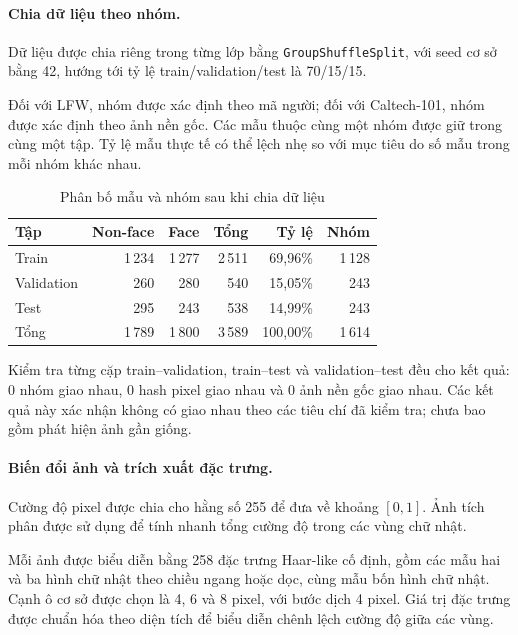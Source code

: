 \documentclass[12pt,a4paper,oneside]{report}
\begin{document}
\paragraph{Chia dữ liệu theo nhóm.}

Dữ liệu được chia riêng trong từng lớp bằng
\texttt{GroupShuffleSplit}, với seed cơ sở bằng 42,
hướng tới tỷ lệ train/validation/test là 70/15/15.

Đối với LFW, nhóm được xác định theo mã người;
đối với Caltech-101, nhóm được xác định theo ảnh nền gốc.
Các mẫu thuộc cùng một nhóm được giữ trong cùng một tập.
Tỷ lệ mẫu thực tế có thể lệch nhẹ so với mục tiêu
do số mẫu trong mỗi nhóm khác nhau.

\begin{table}[H]
    \centering
    \caption{Phân bố mẫu và nhóm sau khi chia dữ liệu}
    \label{tab:chia_tap_mohinh}
    \small
    \begin{tabularx}{\textwidth}{
        >{\raggedright\arraybackslash}X r r r r r}
        \toprule
        \textbf{Tập}
        & \textbf{Non-face}
        & \textbf{Face}
        & \textbf{Tổng}
        & \textbf{Tỷ lệ}
        & \textbf{Nhóm} \\
        \midrule
        Train
        & 1\,234 & 1\,277 & 2\,511 & 69,96\% & 1\,128 \\
        Validation
        & 260 & 280 & 540 & 15,05\% & 243 \\
        Test
        & 295 & 243 & 538 & 14,99\% & 243 \\
        \midrule
        Tổng
        & 1\,789 & 1\,800 & 3\,589 & 100,00\% & 1\,614 \\
        \bottomrule
    \end{tabularx}
\end{table}

Kiểm tra từng cặp train--validation, train--test
và validation--test đều cho kết quả:
0 nhóm giao nhau, 0 hash pixel giao nhau
và 0 ảnh nền gốc giao nhau.
Các kết quả này xác nhận không có giao nhau
theo các tiêu chí đã kiểm tra;
chưa bao gồm phát hiện ảnh gần giống.

\paragraph{Biến đổi ảnh và trích xuất đặc trưng.}

Cường độ pixel được chia cho hằng số 255
để đưa về khoảng $[0,1]$.
Ảnh tích phân được sử dụng để tính nhanh
tổng cường độ trong các vùng chữ nhật.

Mỗi ảnh được biểu diễn bằng 258 đặc trưng Haar-like
cố định, gồm các mẫu hai và ba hình chữ nhật
theo chiều ngang hoặc dọc, cùng mẫu bốn hình chữ nhật.
Cạnh ô cơ sở được chọn là 4, 6 và 8 pixel,
với bước dịch 4 pixel.
Giá trị đặc trưng được chuẩn hóa theo diện tích
để biểu diễn chênh lệch cường độ giữa các vùng.
\end{document}
